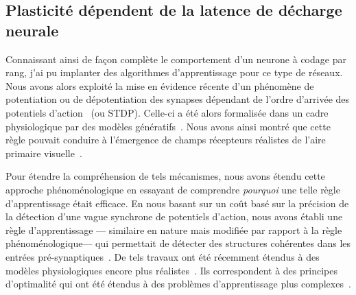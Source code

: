 \documentclass[11pt,french,a4paper,oneside]{article}%
\begin{document}
\subsection{Plasticité dépendent de la latence de décharge neurale}
Connaissant ainsi de façon complète le comportement d'un neurone à codage par rang, j'ai pu implanter des algorithmes d'apprentissage pour ce type de réseaux. Nous avons alors exploité la mise en évidence récente d'un phénomène de potentiation ou de dépotentiation des synapses dépendant de l'ordre d'arrivée des potentiels d'action~\citep{Markram97a,Bi98} (ou STDP). Celle-ci a été alors formalisée dans un cadre physiologique par des modèles génératifs~\citep{Perrinet00,Perrinet01}. Nous avons ainsi montré que cette règle pouvait conduire à l'émergence de champs récepteurs réalistes de l'aire primaire visuelle~\citep{Delorme01a}. %

Pour étendre la compréhension de tels mécanismes, nous avons étendu cette approche phénoménologique en essayant de comprendre \emph{pourquoi} une telle règle d'apprentissage était efficace. En nous basant sur un coût basé sur la précision de la détection d'une vague synchrone de potentiels d'action, nous avons établi une règle d'apprentissage --- similaire en nature mais modifiée par rapport à la règle phénoménologique--- qui permettait de détecter des structures cohérentes dans les entrées pré-synaptiques~\citep{Perrinet02stdp}. De tels travaux ont été récemment étendus à des modèles physiologiques encore plus réalistes~\citep{Masquelier12}. Ils correspondent à des principes d'optimalité qui ont été étendus à des problèmes d'apprentissage plus complexes~\citep{Habenschuss13}. %
\end{document}
